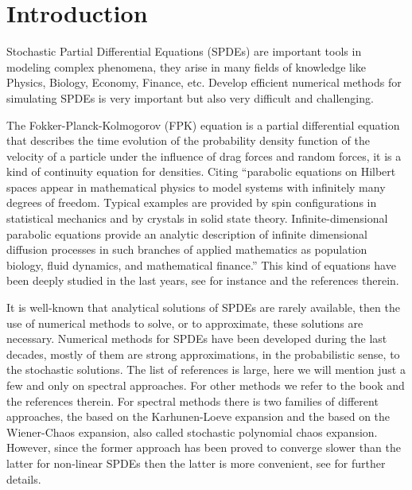 \documentclass[]{interact}
\theoremstyle{plain}%
\theoremstyle{definition}
\theoremstyle{remark}
\begin{document}
\section{Introduction}
        Stochastic Partial Differential Equations (SPDEs) are important tools in
    modeling complex phenomena, they arise in many fields of knowledge like
    Physics, Biology, Economy, Finance, etc. Develop efficient numerical
    methods for simulating SPDEs is very important but also very difficult and
    challenging.
    
        The  Fokker-Planck-Kolmogorov (FPK) equation is a partial differential
    equation that describes the time evolution of the probability density 
    function of the velocity of a particle under the influence of drag forces 
    and random forces, it is a kind of continuity equation for densities. 
    Citing \cite{da-za}
    ``parabolic equations on Hilbert spaces appear in mathematical physics to 
    model systems with infinitely many degrees of freedom. Typical examples are 
    provided by spin configurations in statistical mechanics and by crystals in 
    solid state theory. Infinite-dimensional parabolic equations provide an 
    analytic description of infinite dimensional diffusion processes in such 
    branches of applied mathematics as population biology, fluid dynamics, and 
    mathematical finance.'' This kind of equations have been deeply studied in 
    the last years, see for instance \cite{bo-da-ro, da-fl-ro, da} and the 
    references therein.
    
     It is well-known that analytical solutions of SPDEs are rarely available, then the use of numerical methods to solve, or to approximate, these solutions are necessary. Numerical methods for SPDEs have been developed during the last decades, mostly of them are strong approximations, in the probabilistic sense, to the stochastic solutions. The list of references is large, here we will mention just a few and only on spectral approaches. For other methods we refer to the book \cite{milstein2013stochastic} and the references therein. For spectral methods there is two families of different approaches, the based on the Karhunen-Loeve expansion and the based on the Wiener-Chaos expansion, also called  stochastic polynomial chaos expansion. However, since the former approach has been proved to converge slower than the latter for non-linear SPDEs then the latter is more convenient, see \cite{zhang2017numerical} for further details. 
     
\end{document}
